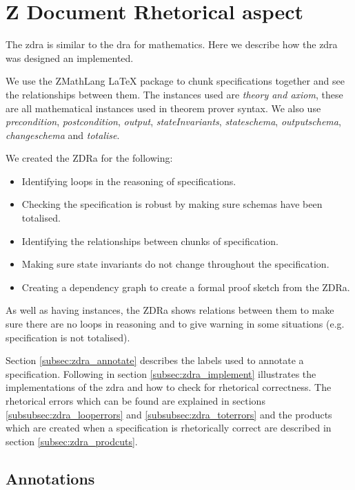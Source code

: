 \chapter{Z Document Rhetorical aspect}
\label{ch:zdra}
The \gls{zdra} is similar to the \gls{dra} for mathematics. Here we describe how the \gls{zdra} was designed an implemented. 

We use the ZMathLang \LaTeX{} package to chunk specifications together and see the relationships between them. The instances used are \textit{theory and axiom}, these are all mathematical instances used in theorem prover syntax. We also use \textit{precondition}, \textit{postcondition}, \textit{output}, \textit{stateInvariants}, \textit{stateschema}, \textit{outputschema}, \textit{changeschema} and \textit{totalise}.

We created the ZDRa for the following:

\begin{itemize}

\item Identifying loops in the reasoning of specifications.
\item Checking the specification is robust by making sure schemas have been totalised.
\item Identifying the relationships between chunks of specification.
\item Making sure state invariants do not change throughout the specification.
\item Creating a dependency graph to create a formal proof sketch from the ZDRa.
\end{itemize}

As well as having instances, the ZDRa shows relations between them to make sure there are no loops in reasoning and to give warning in some situations (e.g. specification is not totalised).

Section \ref{subsec:zdra_annotate} describes the labels used to annotate a specification. Following in section \ref{subsec:zdra_implement} illustrates the implementations of the \gls{zdra} and how to check for rhetorical correctness. The rhetorical errors which can be found are explained in sections \ref{subsubsec:zdra_looperrors} and \ref{subsubsec:zdra_toterrors} and the products which are created when a specification is rhetorically correct are described in section \ref{subsec:zdra_prodcuts}.

\section{Annotations}
\label{sec:zdra_annotate}


